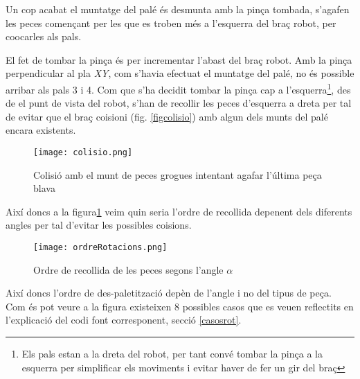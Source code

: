 Un cop acabat el muntatge del palé és desmunta amb la pinça tombada,
s'agafen les peces començant per les que es
troben més a l'esquerra del braç robot, per co\lgem ocarles als pals.

El fet de tombar la pinça és per incrementar l'abast del braç robot. Amb la
pinça perpendicular al pla \emph{XY}, com s'havia efectuat el muntatge del palé, no
és possible arribar als pals 3 i 4. Com que s'ha decidit tombar la pinça
cap a l'esquerra\footnote{Els pals estan a la dreta del robot, per tant convé
tombar la pinça a la esquerra per simplificar els moviments i evitar haver
de fer un gir del braç}, des de el punt de vista del robot, s'han de recollir
les peces d'esquerra a dreta per tal de evitar que el braç co\lgem isioni
(fig. \ref{figcolisio}) amb algun dels munts del palé encara existents.

\begin{figure}[H]
\begin{center}
 \texttt{[image: colisio.png]}
\end{center}
  \caption{Colisió amb el munt de peces grogues intentant agafar l'última peça blava}
\end{figure}\label{figcolisio}

Així doncs a la figura\ref{figrecpec}
veim quin seria l'ordre de recollida depenent dels diferents angles per tal
d'evitar les possibles co\lgem isions.

\begin{figure}[H]
\begin{center}\label{figrecpec}
 \texttt{[image: ordreRotacions.png]}
\end{center}
  \caption{Ordre de recollida de les peces segons l'angle $\alpha$}
\end{figure}

Així doncs l'ordre de des-paletització depèn de l'angle i no del tipus de peça.
Com és pot veure a la figura existeixen 8 possibles casos que es veuen
reflectits en l'explicació del codi font corresponent, secció \ref{casosrot}.